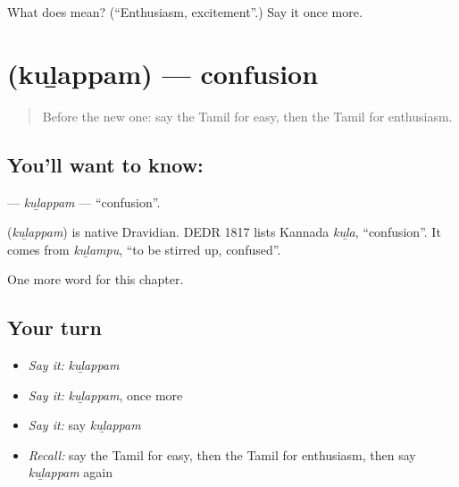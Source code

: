 \begin{tcolorbox}[breakable,colback=teal!4,colframe=teal!35!black,title={Before you move on}]
What does  mean? (\textquotedblleft{}Enthusiasm, excitement\textquotedblright{}.) Say it once more.
\end{tcolorbox}
\section[\texorpdfstring{\ta{குழப்பம்} (kuḻappam)}{குழப்பம் (kuḻappam)}]{ (kuḻappam) — confusion}

\label{lesson:TA-C268-kulappam}



\begin{quote}
Before the new one: say the Tamil for easy, then the Tamil for enthusiasm.
\end{quote}

\subsection*{You'll want to know: }
\textbf{} — \emph{kuḻappam} — \textquotedblleft{}confusion\textquotedblright{}.

\begin{cousinweb}
\textbf{} (\emph{kuḻappam}) is native Dravidian. DEDR 1817 lists Kannada \emph{kuḻa}, \textquotedblleft{}confusion\textquotedblright{}. It comes from \emph{kuḻampu}, \textquotedblleft{}to be stirred up, confused\textquotedblright{}.
\end{cousinweb}

\begin{grammarlens}[title={What you've built}]
One more word for this chapter.
\end{grammarlens}

\subsection*{Your turn}
\begin{itemize}
\raggedright
  \item \emph{Say it:} \emph{kuḻappam}
  \item \emph{Say it:} \emph{kuḻappam}, once more
  \item \emph{Say it:} say \emph{kuḻappam}
  \item \emph{Recall:} say the Tamil for easy, then the Tamil for enthusiasm, then say \emph{kuḻappam} again
\end{itemize}

